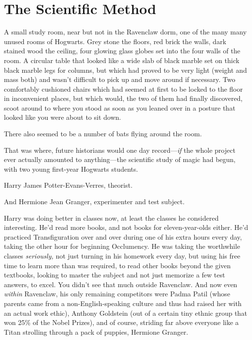 \chapter{The Scientific Method}

\lettrine{A}{} small study room, near but not in the Ravenclaw dorm, one of the many many
unused rooms of Hogwarts. Grey stone the floors, red brick the walls, dark
stained wood the ceiling, four glowing glass globes set into the four walls of
the room. A circular table that looked like a wide slab of black marble set on
thick black marble legs for columns, but which had proved to be very light
(weight and mass both) and wasn't difficult to pick up and move around if
necessary. Two comfortably cushioned chairs which had seemed at first to be
locked to the floor in inconvenient places, but which would, the two of them
had finally discovered, scoot around to where you stood as soon as you leaned
over in a posture that looked like you were about to sit down.

There also seemed to be a number of bats flying around the room.

That was where, future historians would one day record—\emph{if} the whole
project ever actually amounted to anything—the scientific study of magic had
begun, with two young first-year Hogwarts students.

Harry James Potter-Evans-Verres, theorist.

And Hermione Jean Granger, experimenter and test subject.

Harry was doing better in classes now, at least the classes he considered
interesting. He'd read more books, and not books for eleven-year-olds either.
He'd practiced Transfiguration over and over during one of his extra hours
every day, taking the other hour for beginning Occlumency. He was taking the
worthwhile classes \emph{seriously,} not just turning in his homework every
day, but using his free time to learn more than was required, to read other
books beyond the given textbooks, looking to master the subject and not just
memorize a few test answers, to excel. You didn't see that much outside
Ravenclaw. And now even \emph{within} Ravenclaw, his only remaining competitors
were Padma Patil (whose parents came from a non-English-speaking culture and
thus had raised her with an actual work ethic), Anthony Goldstein (out of a
certain tiny ethnic group that won 25\% of the Nobel Prizes), and of course,
striding far above everyone like a Titan strolling through a pack of puppies,
Hermione Granger.

